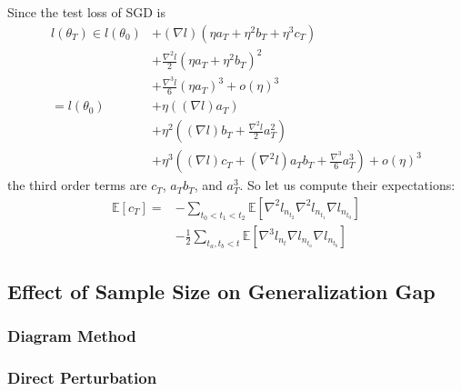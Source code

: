 \documentclass{article}
\newcommand{\expct}[1]{\mathbb{E}\left[#1\right]}
\newcommand{\wrap}[1]{\left(#1\right)}
\begin{document}
            Since the test loss of SGD is
            \begin{align*}
                l(\theta_T)
                \in
                        l(\theta_0)
                &+     (\nabla   l)(\eta a_T + \eta^2 b_T + \eta^3 c_T)                                 \\
                &+\frac{\nabla^2 l}{2}(\eta a_T + \eta^2 b_T             )^2                            \\
                &+\frac{\nabla^3 l}{6}(\eta a_T                          )^3 
                 +o(\eta)^3                                                                             \\
                =
                    l(\theta_0)
                &+  \eta       \wrap{(\nabla l) a_T                               }                     \\
                &+  \eta^2     \wrap{(\nabla l) b_T + \frac{\nabla^2 l}{2} a_T^2  }                     \\
                &+  \eta^3     \wrap{(\nabla l) c_T + (\nabla^2 l) a_T b_T + \frac{\nabla^3}{6} a_T^3}
                 +o(\eta)^3                                                                             
            \end{align*}
            the third order terms are $c_T$, $a_T b_T$, and $a_T^3$.  So let us
            compute their expectations:
            \begin{align*}
                \expct{c_T} =
                   &-\sum_{t_0 < t_1 < t_2} 
                     \expct{\nabla^2 l_{n_{t_2}} \nabla^2 l_{n_{t_1}} \nabla l_{n_{t_0}}}
                   \\
                   &-\frac{1}{2} \sum_{t_a, t_b < t}
                     \expct{\nabla^3 l_{n_t} \nabla l_{n_{t_a}} \nabla l_{n_{t_b}}}
            \end{align*}


    \subsection*{Effect of Sample Size on Generalization Gap}
        \subsubsection*{Diagram Method}
            
        \subsubsection*{Direct Perturbation}
\end{document}
